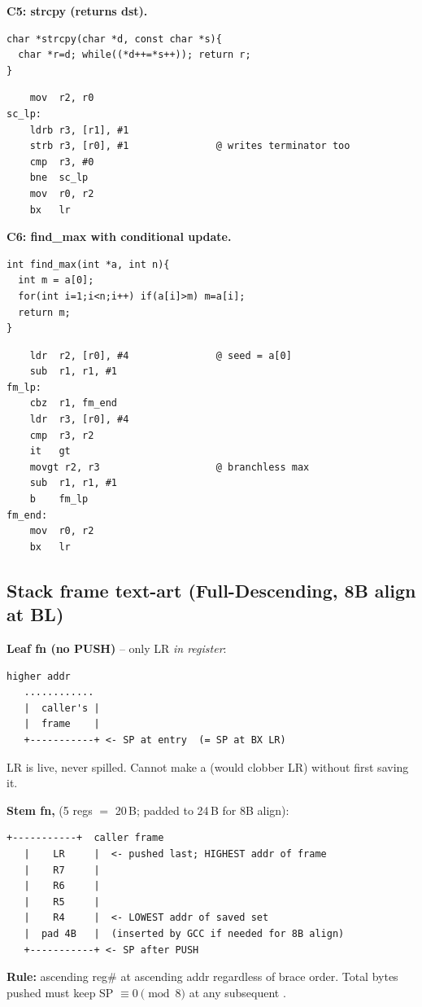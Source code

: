 \textbf{C5: strcpy (returns dst).}
\begin{lstlisting}[language={}]
char *strcpy(char *d, const char *s){
  char *r=d; while((*d++=*s++)); return r;
}
\end{lstlisting}
\begin{lstlisting}
    mov  r2, r0
sc_lp:
    ldrb r3, [r1], #1
    strb r3, [r0], #1               @ writes terminator too
    cmp  r3, #0
    bne  sc_lp
    mov  r0, r2
    bx   lr
\end{lstlisting}

\textbf{C6: find\_max with conditional update.}
\begin{lstlisting}[language={}]
int find_max(int *a, int n){
  int m = a[0];
  for(int i=1;i<n;i++) if(a[i]>m) m=a[i];
  return m;
}
\end{lstlisting}
\begin{lstlisting}
    ldr  r2, [r0], #4               @ seed = a[0]
    sub  r1, r1, #1
fm_lp:
    cbz  r1, fm_end
    ldr  r3, [r0], #4
    cmp  r3, r2
    it   gt
    movgt r2, r3                    @ branchless max
    sub  r1, r1, #1
    b    fm_lp
fm_end:
    mov  r0, r2
    bx   lr
\end{lstlisting}

\subsection{Stack frame text-art (Full-Descending, 8B align at BL)}

\textbf{Leaf fn (no PUSH)} -- only LR \emph{in register}:
\begin{lstlisting}[language={}]
   higher addr
   ............
   |  caller's |
   |  frame    |
   +-----------+ <- SP at entry  (= SP at BX LR)
\end{lstlisting}
LR is live, never spilled. Cannot make a  (would clobber LR) without first saving it.

\textbf{Stem fn, } (5 regs $=$ 20\,B; padded to 24\,B for 8B align):
\begin{lstlisting}[language={}]
   +-----------+  caller frame
   |    LR     |  <- pushed last; HIGHEST addr of frame
   |    R7     |
   |    R6     |
   |    R5     |
   |    R4     |  <- LOWEST addr of saved set
   |  pad 4B   |  (inserted by GCC if needed for 8B align)
   +-----------+ <- SP after PUSH
\end{lstlisting}
\textbf{Rule:} ascending reg\# at ascending addr regardless of brace order. Total bytes pushed must keep SP $\equiv 0\pmod 8$ at any subsequent .

